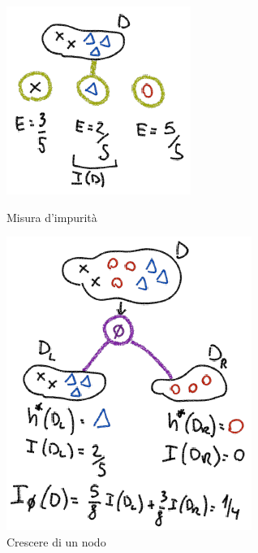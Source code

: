 	\begin{figure}
		\centering
		\begin{minipage}{.5\textwidth}
			\centering
			\includegraphics[width=0.6\linewidth]{imgs/chapter5/img3}
			\caption{Misura d'impurit\`a}
			\label{fig:chapter05-03}
		\end{minipage}%
		\begin{minipage}{.5\textwidth}
			\centering
			\includegraphics[width=0.6\linewidth]{imgs/chapter5/img4}
			\caption{Crescere di un nodo}
			\label{fig:chapter05-04}
		\end{minipage}
	\end{figure}
	
